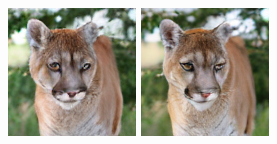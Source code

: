 \begin{figure}[h]
\begin{minipage}{0.15\textwidth}
    \end{minipage}
    \begin{minipage}{0.15\textwidth}
        \centering
        \includegraphics[width=\linewidth]{material/1k/224.png}
    \end{minipage}
    \begin{minipage}{0.15\textwidth}
        \centering
        \includegraphics[width=\linewidth]{material/8k/224.png}

\end{minipage}
\end{figure}
